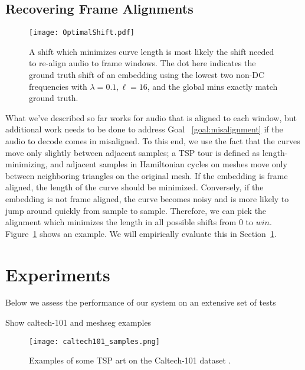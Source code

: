 \documentclass[runningheads]{llncs}
\begin{document}
\subsection{Recovering Frame Alignments}

\begin{figure}
  \centering
  \texttt{[image: OptimalShift.pdf]}
  \caption{A shift which minimizes curve length is most likely the shift needed to re-align audio to frame windows.  The dot here indicates the ground truth shift of an embedding using the lowest two non-DC frequencies with $\lambda=0.1, \ell=16$, and the global mins exactly match ground truth.}
  \label{fig:FrameAlignments}
\end{figure}

What we've described so far works for audio that is aligned to each window, but additional work needs to be done to address Goal ~\ref{goal:misalignment} if the audio to decode comes in misaligned.  To this end, we use the fact that the curves move only slightly between adjacent samples; a TSP tour is defined as length-minimizing, and adjacent samples in Hamiltonian cycles on meshes move only between neighboring triangles on the original mesh.  If the embedding is frame aligned, the length of the curve should be minimized.  Conversely, if the embedding is not frame aligned, the curve becomes noisy and is more likely to jump around quickly from sample to sample.  Therefore, we can pick the alignment which minimizes the length in all possible shifts from $0$ to $win$.  Figure~\ref{fig:FrameAlignments} shows an example.  We will empirically evaluate this in Section~\ref{sec:experiments}.





\section{Experiments}
\label{sec:experiments}

Below we assess the performance of our system on an extensive set of tests

Show caltech-101 and meshseg examples

\begin{figure}
  \centering
  \texttt{[image: caltech101\_samples.png]}
  \caption{Examples of some TSP art on the Caltech-101 dataset \cite{li_andreeto_ranzato_perona_2022}.}
  \label{fig:caltech101examples}
\end{figure}
\end{document}
